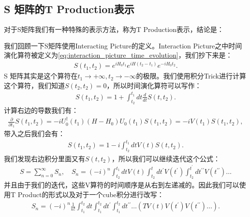 \subsection{S 矩阵的T Production表示}

对于S矩阵我们有一种特殊的表示方法，称为T Production表示，结论是：

\bigskip
{}

我们回顾一下S矩阵使用Interacting Picture的定义。Interaction
Picture之中时间演化算符被定义为\cref{eq:interaction_picture_time_evolution}，我们抄下来是：
\begin{align}
  S(t_1,t_2)=e^{iH_0t_1}e^{iH(t_2-t_1)}e^{-iH_0t_2}.
\end{align}
S 矩阵其实是这个算符在$ t_1\to+\infty,t_2\to-\infty
$的极限。我们使用积分Trick进行计算这个算符，我们知道$ S(t_2,t_2) = 0 $，所以时间演化算符可以写作：
\begin{align}
  S(t_1,t_2) = 1 + \int_{t_2}^{t_1} dt \frac{d}{dt} S(t,t_2).
\end{align}
计算右边的导数我们有：
\begin{align}
  \frac{\partial}{\partial
  t_1}S(t_1,t_2)=-iU_0^\dagger(t_1)(H-H_0)U_0(t_1)S(t_1,t_2)=-iV(t_1)S(t_1,t_2),
\end{align}
带入之后我们会有：
\begin{align}
  S(t_1,t_2)=1-i\int_{t_2}^{t_1}dtV(t)S(t,t_2).
\end{align}
我们发现右边积分里面又有$ S(t,t_2) $，所以我们可以继续迭代这个公式：
\begin{align}
  S=\sum_{n=0}^\infty S_n, \quad
  S_n=(-i)^n\int_{t_2}^{t_1}dtV(t)\int_{t_2}^tdt^{\prime}V(t^{\prime})\int_{t_2}^{t^{\prime}}dt^{\prime\prime}V(t^{\prime\prime})\ldots
\end{align}
并且由于我们的迭代，这些V算符的时间顺序是从右到左递减的。因此我们可以使用T Product的形式以及对于一个cube积分进行改写：
\begin{align}
  S_n=(-i)^n\frac{1}{n!}\int_{t_1}^{t_2}dt\int_{t_1}^{t_2}dt^{\prime}\int_{t_1}^{t_2}dt^{\prime\prime}\ldots\left(TV(t)V(t^{\prime})V(t^{\prime\prime})\ldots\right).
\end{align}
